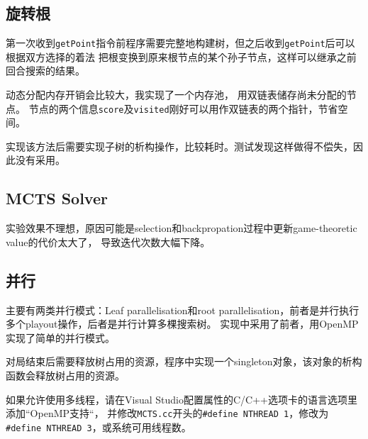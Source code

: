 \subsection{旋转根}

第一次收到\texttt{getPoint}指令前程序需要完整地构建树，但之后收到\texttt{getPoint}后可以根据双方选择的着法
把根变换到原来根节点的某个孙子节点，这样可以继承之前回合搜索的结果。

动态分配内存开销会比较大，我实现了一个内存池，
用双链表储存尚未分配的节点。
节点的两个信息\texttt{score}及\texttt{visited}刚好可以用作双链表的两个指针，节省空间。

实现该方法后需要实现子树的析构操作，比较耗时。测试发现这样做得不偿失，因此没有采用。

\subsection{MCTS Solver}

实验效果不理想，原因可能是selection和backpropation过程中更新game-theoretic value的代价太大了，
导致迭代次数大幅下降。

\subsection{并行}

主要有两类并行模式：Leaf parallelisation和root parallelisation，前者是并行执行多个playout操作，后者是并行计算多棵搜索树。
实现中采用了前者，用OpenMP实现了简单的并行模式。

对局结束后需要释放树占用的资源，程序中实现一个singleton对象，该对象的析构函数会释放树占用的资源。

如果允许使用多线程，请在Visual Studio配置属性的C/C++选项卡的语言选项里添加“OpenMP支持“，
并修改\texttt{MCTS.cc}开头的\texttt{\#define NTHREAD 1}，修改为\texttt{\#define NTHREAD 3}，或系统可用线程数。
